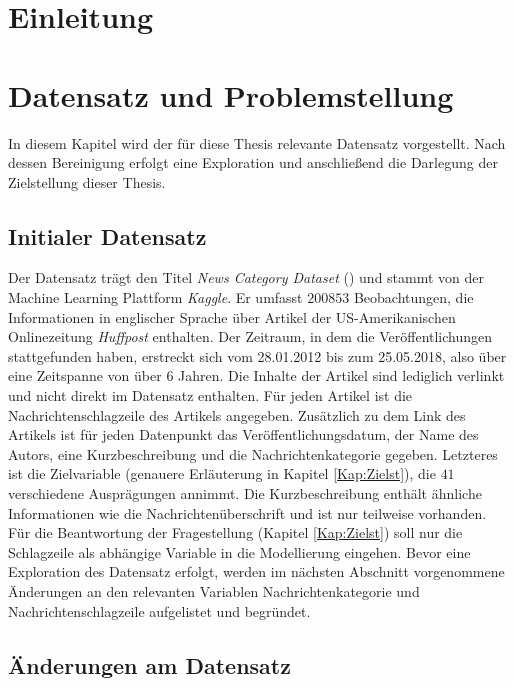 \documentclass[a4paper,11pt]{article}
\begin{document}
\section{Einleitung}



\section{Datensatz und Problemstellung}

In diesem Kapitel wird der für diese Thesis relevante Datensatz vorgestellt. Nach dessen Bereinigung erfolgt eine Exploration und anschließend die Darlegung der Zielstellung dieser Thesis.


\subsection{Initialer Datensatz}

Der Datensatz trägt den Titel \textit{News Category Dataset} (\cite{dataset}) und stammt von der Machine Learning Plattform \textit{Kaggle}. Er umfasst $200853$ Beobachtungen, die Informationen in englischer Sprache über Artikel der US-Amerikanischen Onlinezeitung \textit{Huffpost} enthalten. Der Zeitraum, in dem die Veröffentlichungen stattgefunden haben, erstreckt sich vom 28.01.2012 bis zum 25.05.2018, also über eine Zeitspanne von über $6$ Jahren. Die Inhalte der Artikel sind lediglich verlinkt und nicht direkt im Datensatz enthalten. Für jeden Artikel ist die Nachrichtenschlagzeile des Artikels angegeben. Zusätzlich zu dem Link des Artikels ist für jeden Datenpunkt das Veröffentlichungsdatum, der Name des Autors, eine Kurzbeschreibung und die Nachrichtenkategorie gegeben. Letzteres ist die Zielvariable (genauere Erläuterung in Kapitel \ref{Kap:Zielst}), die $41$ verschiedene Ausprägungen annimmt. Die Kurzbeschreibung enthält ähnliche Informationen wie die Nachrichtenüberschrift und ist nur teilweise vorhanden. Für die Beantwortung der Fragestellung (Kapitel \ref{Kap:Zielst}) soll nur die Schlagzeile als abhängige Variable in die Modellierung eingehen. Bevor eine Exploration des Datensatz erfolgt, werden im nächsten Abschnitt vorgenommene Änderungen an den relevanten Variablen Nachrichtenkategorie und Nachrichtenschlagzeile aufgelistet und begründet.


\subsection{Änderungen am Datensatz} \label{kap:2_2Aend}
\end{document}
